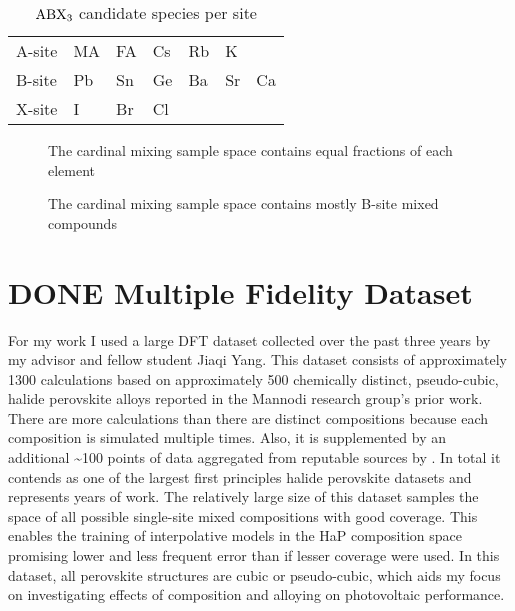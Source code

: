 \begin{table}[htbp]
\caption{\label{tbl:site_tbl} \(\ce{ABX3}\) candidate species per site}
\centering
\begin{tabular}{l|llllll}
A-site & MA & FA & Cs & Rb & K & \\[0pt]
B-site & Pb & Sn & Ge & Ba & Sr & Ca\\[0pt]
X-site & I & Br & Cl &  &  & \\[0pt]
\end{tabular}
\end{table}

 
\begin{figure}[htbp]
\centering

\caption{The cardinal mixing sample space contains equal fractions of each element}
\end{figure}

 
\begin{figure}[htbp]
\centering

\caption{\label{fig:domainmix} The cardinal mixing sample space contains mostly B-site mixed compounds}
\end{figure}

\section{{\bfseries\sffamily DONE} Multiple Fidelity Dataset}
\label{sec:orgc6c7786}
For my work I used a large DFT dataset collected over the past three years by my advisor and fellow student Jiaqi Yang.
This dataset consists of approximately 1300 calculations based on approximately 500 chemically distinct, pseudo-cubic, halide perovskite alloys reported in the Mannodi research group's prior work.
\autocite{mannodi-kanakkithodi-2022-data-driven,yang-2023-high-throug}
There are more calculations than there are distinct compositions because each composition is simulated multiple times.
Also, it is supplemented by an additional \textasciitilde{}100 points of data aggregated from reputable sources by \textcite{almora-2020-devic-perfor}.
In total it contends as one of the largest first principles halide perovskite datasets and represents years of work.
The relatively large size of this dataset samples the space of all possible single-site mixed compositions with good coverage.
This enables the training of interpolative models in the HaP composition space promising lower and less frequent error than if lesser coverage were used.
In this dataset, all perovskite structures are cubic or pseudo-cubic, which aids my focus on investigating effects of composition and alloying on photovoltaic performance.

